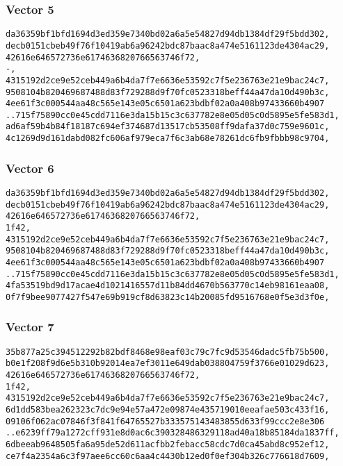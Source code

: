 \documentclass[
]{article}
\begin{document}
\subsubsection{Vector 5}\label{vector-5}

\begin{verbatim}
da36359bf1bfd1694d3ed359e7340bd02a6a5e54827d94db1384df29f5bdd302,
decb0151cbeb49f76f10419ab6a96242bdc87baac8a474e5161123de4304ac29,
42616e646572736e6174636820766563746f72,
-,
4315192d2ce9e52ceb449a6b4da7f7e6636e53592c7f5e236763e21e9bac24c7,
9508104b820469687488d83f729288d9f70fc0523318beff44a47da10d490b3c,
4ee61f3c000544aa48c565e143e05c6501a623bdbf02a0a408b97433660b4907
..715f75890cc0e45cdd7116e3da15b15c3c637782e8e05d05c0d5895e5fe583d1,
ad6af59b4b84f18187c694ef374687d13517cb53508ff9dafa37d0c759e9601c,
4c1269d9d161dabd082fc606af979eca7f6c3ab68e78261dc6fb9fbbb98c9704,
\end{verbatim}

\subsubsection{Vector 6}\label{vector-6}

\begin{verbatim}
da36359bf1bfd1694d3ed359e7340bd02a6a5e54827d94db1384df29f5bdd302,
decb0151cbeb49f76f10419ab6a96242bdc87baac8a474e5161123de4304ac29,
42616e646572736e6174636820766563746f72,
1f42,
4315192d2ce9e52ceb449a6b4da7f7e6636e53592c7f5e236763e21e9bac24c7,
9508104b820469687488d83f729288d9f70fc0523318beff44a47da10d490b3c,
4ee61f3c000544aa48c565e143e05c6501a623bdbf02a0a408b97433660b4907
..715f75890cc0e45cdd7116e3da15b15c3c637782e8e05d05c0d5895e5fe583d1,
4fa53519bd9d17acae4d1021416557d11b84dd4670b563770c14eb98161eaa08,
0f7f9bee9077427f547e69b919cf8d63823c14b20085fd9516768e0f5e3d3f0e,
\end{verbatim}

\subsubsection{Vector 7}\label{vector-7}

\begin{verbatim}
35b877a25c394512292b82bdf8468e98eaf03c79c7fc9d53546dadc5fb75b500,
b0e1f208f9d6e5b310b92014ea7ef3011e649dab038804759f3766e01029d623,
42616e646572736e6174636820766563746f72,
1f42,
4315192d2ce9e52ceb449a6b4da7f7e6636e53592c7f5e236763e21e9bac24c7,
6d1dd583bea262323c7dc9e94e57a472e09874e435719010eeafae503c433f16,
09106f062ac07846f3f841f64765527b333575143483855d633f99ccc2e8e306
..e6239ff79a1272cff931e8d0ac6c390328486329118ad40a18b85184da1837ff,
6dbeeab9648505fa6a95de52d611acfbb2febacc58cdc7d0ca45abd8c952ef12,
ce7f4a2354a6c3f97aee6cc60c6aa4c4430b12ed0f0ef304b326c776618d7609,
\end{verbatim}
\end{document}
